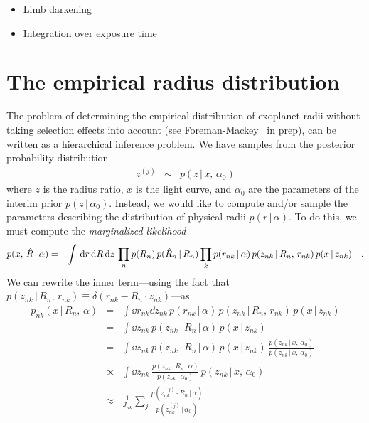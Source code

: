 \documentclass[12pt,preprint]{aastex}
\begin{document}
\begin{itemize}
\item{Limb darkening}
\item{Integration over exposure time}
\end{itemize}

\section{The empirical radius distribution}

The problem of determining the empirical distribution of exoplanet radii
without taking selection effects into account (see Foreman-Mackey \etal\ in
prep), can be written as a hierarchical inference problem.
We have samples from the posterior probability distribution
\begin{eqnarray}
z^{(j)} &\sim& p(z\,|\,x,\,\alpha_0)
\end{eqnarray}
where $z$ is the radius ratio, $x$ is the light curve, and $\alpha_0$ are the
parameters of the interim prior $p(z\,|\,\alpha_0)$.
Instead, we would like to compute and/or sample the parameters describing the
distribution of physical radii $p(r\,|\,\alpha)$.
To do this, we must compute the \emph{marginalized likelihood}
\begin{eqnarray}\eqlabel{marg-like}
p(x,\,\hat{R}\,|\,\alpha) &=&
    \int \dd r\dd R\dd z\,\prod_n p(R_n)\,p(\hat{R}_n\,|\,R_n)
        \prod_k p(r_{nk}\,|\,\alpha)\,p(z_{nk}\,|\,R_n,\,r_{nk})\,
                p(x\,|\,z_{nk}) \quad.
\end{eqnarray}
We can rewrite the inner term---using the fact that
$p(z_{nk}\,|\,R_n,\,r_{nk})\equiv\delta(r_{nk}-R_n\cdot z_{nk})$---as
\begin{eqnarray}
p_{nk}(x\,|\,R_n,\,\alpha)&=&
\int \dd r_{nk}\dd z_{nk}\,p(r_{nk}\,|\,\alpha)\,p(z_{nk}\,|\,R_n,\,r_{nk})\,
        p(x\,|\,z_{nk}) \nonumber\\
&=&
\int \dd z_{nk}\,p(z_{nk} \cdot R_n\,|\,\alpha)\,p(x\,|\,z_{nk}) \nonumber\\
&=&
\int \dd z_{nk}\,p(z_{nk}\cdot R_n\,|\,\alpha)\,p(x\,|\,z_{nk})\,
\frac{p(z_{nk}\,|\,x,\,\alpha_0)}{p(z_{nk}\,|\,x,\,\alpha_0)} \nonumber\\
&\propto&
\int \dd z_{nk}\,\frac{p(z_{nk}\cdot R_n\,|\,\alpha)}{p(z_{nk}\,|\,\alpha_0)}\,
p(z_{nk}\,|\,x,\,\alpha_0) \nonumber\\
&\approx&
\frac{1}{J_{nk}}
\sum_j \frac{p(z_{nk}^{(j)}\cdot R_n\,|\,\alpha)}{p(z_{nk}^{(j)}\,|\,\alpha_0)}
\end{eqnarray}
\end{document}
